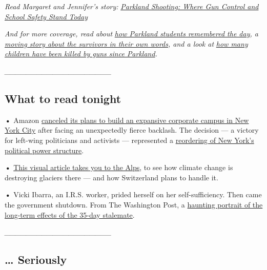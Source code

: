 \emph{Read Margaret and Jennifer's story:}
\href{https://www.nytimes3xbfgragh.onion/2019/02/13/us/parkland-shooting.html}{\emph{Parkland
Shooting: Where Gun Control and School Safety Stand Today}}

\emph{And for more coverage, read about}
\href{https://www.nytimes3xbfgragh.onion/2019/02/14/us/parkland-shooting-anniversary.html}{\emph{how
Parkland students remembered the day}}\emph{, a}
\href{https://www.nytimes3xbfgragh.onion/2019/02/13/us/parkland-anniversary-marjory-stoneman-douglas.html?module=inline}{\emph{moving
story about the survivors in their own words}}\emph{, and a look at}
\href{https://www.nytimes3xbfgragh.onion/2019/02/13/us/parkland-obituaries-students.html}{\emph{how
many children have been killed by guns since Parkland}}\emph{.}

\emph{\_\_\_\_\_\_\_\_\_\_\_\_\_\_\_\_\_\_\_\_}

\hypertarget{what-to-read-tonight}{%
\subsection{What to read tonight}\label{what-to-read-tonight}}

\textbf{•} Amazon
\href{https://www.nytimes3xbfgragh.onion/2019/02/14/nyregion/amazon-hq2-queens.html}{canceled
its plans to build an expansive corporate campus in New York City} after
facing an unexpectedly fierce backlash. The decision --- a victory for
left-wing politicians and activists --- represented a
\href{https://www.nytimes3xbfgragh.onion/2019/02/14/nyregion/cuomo-aoc-amazon.html}{reordering
of New York's political power structure}.

\textbf{•}
\href{https://www.nytimes3xbfgragh.onion/interactive/2019/02/13/climate/switzerland-glaciers-climate-change.html}{This
visual article takes you to the Alps}, to see how climate change is
destroying glaciers there --- and how Switzerland plans to handle it.

\textbf{•} Vicki Ibarra, an I.R.S. worker, prided herself on her
self-sufficiency. Then came the government shutdown. From The Washington
Post, a
\href{https://www.washingtonpost.com/national/devastated-by-one-shutdown-dreading-the-next/2019/02/10/5ec2afcc-2b06-11e9-b011-d8500644dc98_story.html?utm_term=.f6f1e521a110}{haunting
portrait of the long-term effects of the 35-day stalemate}.

\emph{\_\_\_\_\_\_\_\_\_\_\_\_\_\_\_\_\_\_\_\_}

\hypertarget{-seriously}{%
\subsection{\ldots{} Seriously}\label{-seriously}}

